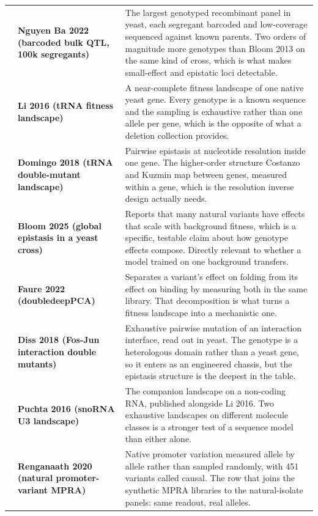 \begin{longtable}{@{}r@{\hspace{4pt}} L{46mm} L{112mm}@{}}
 & \textbf{Nguyen Ba 2022 (barcoded bulk QTL, 100k segregants)} & The largest genotyped recombinant panel in yeast, each segregant barcoded and low-coverage sequenced against known parents. Two orders of magnitude more genotypes than Bloom 2013 on the same kind of cross, which is what makes small-effect and epistatic loci detectable. \\
 & \textbf{Li 2016 (tRNA fitness landscape)} & A near-complete fitness landscape of one native yeast gene. Every genotype is a known sequence and the sampling is exhaustive rather than one allele per gene, which is the opposite of what a deletion collection provides. \\
 & \textbf{Domingo 2018 (tRNA double-mutant landscape)} & Pairwise epistasis at nucleotide resolution inside one gene. The higher-order structure Costanzo and Kuzmin map between genes, measured within a gene, which is the resolution inverse design actually needs. \\
 & \textbf{Bloom 2025 (global epistasis in a yeast cross)} & Reports that many natural variants have effects that scale with background fitness, which is a specific, testable claim about how genotype effects compose. Directly relevant to whether a model trained on one background transfers. \\
 & \textbf{Faure 2022 (doubledeepPCA)} & Separates a variant's effect on folding from its effect on binding by measuring both in the same library. That decomposition is what turns a fitness landscape into a mechanistic one. \\
 & \textbf{Diss 2018 (Fos-Jun interaction double mutants)} & Exhaustive pairwise mutation of an interaction interface, read out in yeast. The genotype is a heterologous domain rather than a yeast gene, so it enters as an engineered chassis, but the epistasis structure is the deepest in the table. \\
 & \textbf{Puchta 2016 (snoRNA U3 landscape)} & The companion landscape on a non-coding RNA, published alongside Li 2016. Two exhaustive landscapes on different molecule classes is a stronger test of a sequence model than either alone. \\
 & \textbf{Renganaath 2020 (natural promoter-variant MPRA)} & Native promoter variation measured allele by allele rather than sampled randomly, with 451 variants called causal. The row that joins the synthetic MPRA libraries to the natural-isolate panels: same readout, real alleles. \\

\end{longtable}

